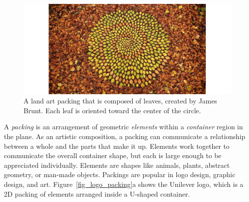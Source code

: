 \begin{figure}
\centering
\includegraphics[width=1.0\textwidth]{figures/intro/woodland.jpg} 
\caption[A land art packing]
{\label{fig_woodland} 
\newtext
{
A land art packing that is composed of leaves, created by James Brunt. 
Each leaf is oriented toward the center of the circle.
}
 }
\end{figure}





\newtext
{
A \textit{packing} is an arrangement of geometric
\textit{elements} within a \textit{container} region in the plane.
As an artistic composition, 
a packing can communicate a relationship between a whole and the parts that make it up.
Elements work together to communicate the overall container shape,
but each is large enough to be appreciated individually.
Elements are shapes like animals, plants, abstract geometry, or man-made objects.
Packings are popular in logo design, graphic design, and art.
Figure~\ref{fig_logo_packing}a shows the Unilever logo,
which is a 2D packing of elements arranged inside a U-shaped container.}


